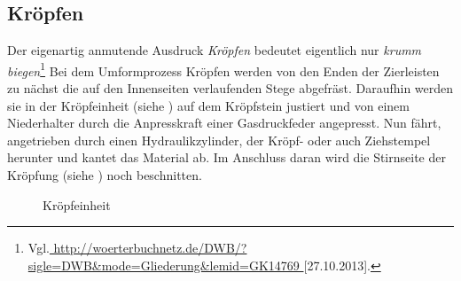 \documentclass[12pt,a4paper,parskip]{scrartcl}
\begin{document}
\subsection{Kröpfen \label{sec:kropf}}
Der eigenartig anmutende Ausdruck \emph{Kröpfen} bedeutet eigentlich nur \emph{krumm biegen}\footnote{Vgl.\url{
http://woerterbuchnetz.de/DWB/?sigle=DWB&mode=Gliederung&lemid=GK14769
}[27.10.2013].}
Bei dem Umformprozess Kröpfen werden von den  Enden der Zierleisten zu nächst die auf den Innenseiten verlaufenden Stege  abgefräst.  Daraufhin werden sie in der Kröpfeinheit (siehe ) auf dem Kröpfstein justiert und von einem Niederhalter durch die Anpresskraft einer Gasdruckfeder angepresst. Nun fährt, angetrieben durch einen Hydraulikzylinder, der Kröpf- oder auch Ziehstempel herunter und kantet das Material ab. Im Anschluss daran wird die Stirnseite der Kröpfung (siehe ) noch beschnitten.
\begin{figure}[!htb]
\centering
\hfill
{}
\hfill
{}
\hfill
\caption{Kröpfeinheit }
\label{fig:kropfeinheit}
\end{figure}
\end{document}
